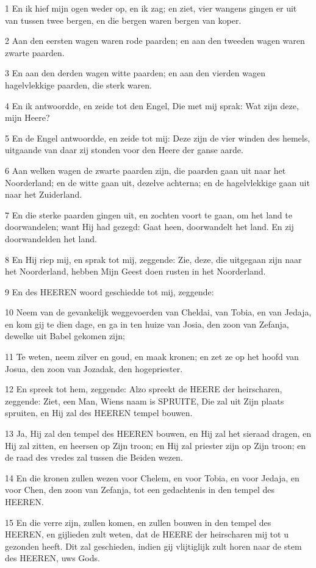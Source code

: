 \par 1 En ik hief mijn ogen weder op, en ik zag; en ziet, vier wangens gingen er uit van tussen twee bergen, en die bergen waren bergen van koper.
\par 2 Aan den eersten wagen waren rode paarden; en aan den tweeden wagen waren zwarte paarden.
\par 3 En aan den derden wagen witte paarden; en aan den vierden wagen hagelvlekkige paarden, die sterk waren.
\par 4 En ik antwoordde, en zeide tot den Engel, Die met mij sprak: Wat zijn deze, mijn Heere?
\par 5 En de Engel antwoordde, en zeide tot mij: Deze zijn de vier winden des hemels, uitgaande van daar zij stonden voor den Heere der ganse aarde.
\par 6 Aan welken wagen de zwarte paarden zijn, die paarden gaan uit naar het Noorderland; en de witte gaan uit, dezelve achterna; en de hagelvlekkige gaan uit naar het Zuiderland.
\par 7 En die sterke paarden gingen uit, en zochten voort te gaan, om het land te doorwandelen; want Hij had gezegd: Gaat heen, doorwandelt het land. En zij doorwandelden het land.
\par 8 En Hij riep mij, en sprak tot mij, zeggende: Zie, deze, die uitgegaan zijn naar het Noorderland, hebben Mijn Geest doen rusten in het Noorderland.
\par 9 En des HEEREN woord geschiedde tot mij, zeggende:
\par 10 Neem van de gevankelijk weggevoerden van Cheldai, van Tobia, en van Jedaja, en kom gij te dien dage, en ga in ten huize van Josia, den zoon van Zefanja, dewelke uit Babel gekomen zijn;
\par 11 Te weten, neem zilver en goud, en maak kronen; en zet ze op het hoofd van Josua, den zoon van Jozadak, den hogepriester.
\par 12 En spreek tot hem, zeggende: Alzo spreekt de HEERE der heirscharen, zeggende: Ziet, een Man, Wiens naam is SPRUITE, Die zal uit Zijn plaats spruiten, en Hij zal des HEEREN tempel bouwen.
\par 13 Ja, Hij zal den tempel des HEEREN bouwen, en Hij zal het sieraad dragen, en Hij zal zitten, en heersen op Zijn troon; en Hij zal priester zijn op Zijn troon; en de raad des vredes zal tussen die Beiden wezen.
\par 14 En die kronen zullen wezen voor Chelem, en voor Tobia, en voor Jedaja, en voor Chen, den zoon van Zefanja, tot een gedachtenis in den tempel des HEEREN.
\par 15 En die verre zijn, zullen komen, en zullen bouwen in den tempel des HEEREN, en gijlieden zult weten, dat de HEERE der heirscharen mij tot u gezonden heeft. Dit zal geschieden, indien gij vlijtiglijk zult horen naar de stem des HEEREN, uws Gods.

